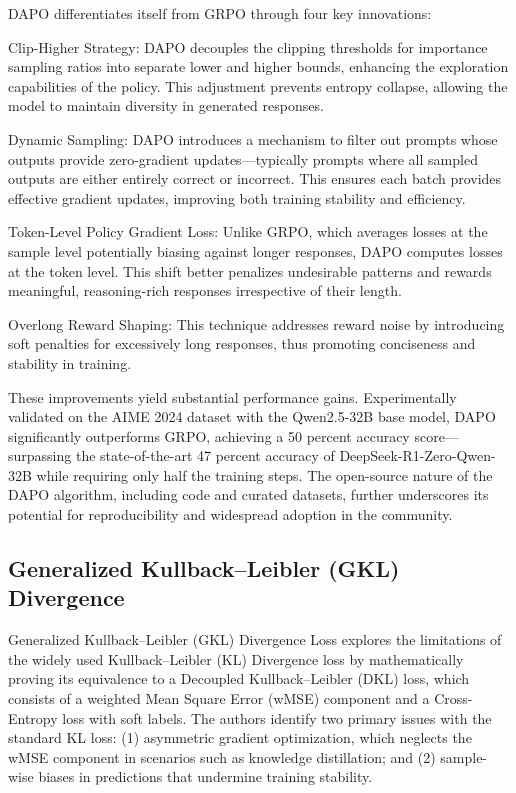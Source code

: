 \documentclass[11pt, oneside]{article}   	%
\begin{document}
DAPO differentiates itself from GRPO through four key innovations:

Clip-Higher Strategy: DAPO decouples the clipping thresholds for importance sampling ratios into separate lower and higher bounds, enhancing the exploration capabilities of the policy. This adjustment prevents entropy collapse, allowing the model to maintain diversity in generated responses.

Dynamic Sampling: DAPO introduces a mechanism to filter out prompts whose outputs provide zero-gradient updates—typically prompts where all sampled outputs are either entirely correct or incorrect. This ensures each batch provides effective gradient updates, improving both training stability and efficiency.

Token-Level Policy Gradient Loss: Unlike GRPO, which averages losses at the sample level potentially biasing against longer responses, DAPO computes losses at the token level. This shift better penalizes undesirable patterns and rewards meaningful, reasoning-rich responses irrespective of their length.

Overlong Reward Shaping: This technique addresses reward noise by introducing soft penalties for excessively long responses, thus promoting conciseness and stability in training.

These improvements yield substantial performance gains. Experimentally validated on the AIME 2024 dataset with the Qwen2.5-32B base model, DAPO significantly outperforms GRPO, achieving a 50 percent accuracy score—surpassing the state-of-the-art 47 percent accuracy of DeepSeek-R1-Zero-Qwen-32B while requiring only half the training steps. The open-source nature of the DAPO algorithm, including code and curated datasets, further underscores its potential for reproducibility and widespread adoption in the community.

\subsection*{Generalized Kullback–Leibler (GKL) Divergence  \cite{cui2025generalizedkullbackleiblerdivergenceloss}}

Generalized Kullback–Leibler (GKL) Divergence Loss explores the limitations of the widely used Kullback–Leibler (KL) Divergence loss by mathematically proving its equivalence to a Decoupled Kullback–Leibler (DKL) loss, which consists of a weighted Mean Square Error (wMSE) component and a Cross-Entropy loss with soft labels. The authors identify two primary issues with the standard KL loss: (1) asymmetric gradient optimization, which neglects the wMSE component in scenarios such as knowledge distillation; and (2) sample-wise biases in predictions that undermine training stability.
\end{document}
